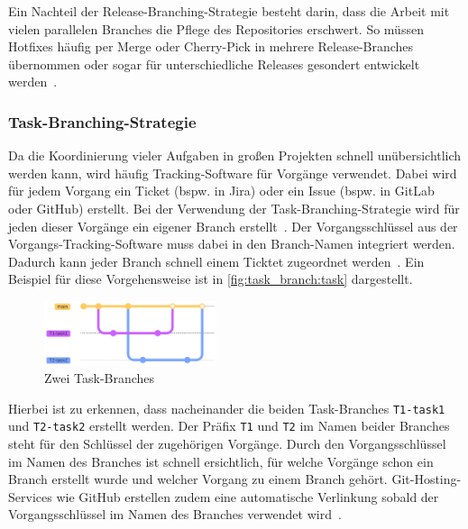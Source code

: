 Ein Nachteil der Release\hyp Branching\hyp Strategie besteht darin, dass die Arbeit mit vielen parallelen Branches die Pflege des Repositories erschwert. So müssen Hotfixes häufig per Merge oder Cherry\hyp Pick in mehrere Release\hyp Branches übernommen oder sogar für unterschiedliche Releases gesondert entwickelt werden~\cite{hart_besten_2020}.


\subsubsection{Task\hyp Branching\hyp Strategie}

Da die Koordinierung vieler Aufgaben in großen Projekten schnell unübersichtlich werden kann, wird häufig Tracking\hyp Software für Vorgänge verwendet. Dabei wird für jedem Vorgang ein Ticket (bspw. in Jira) oder ein Issue (bspw. in GitLab oder GitHub) erstellt. Bei der Verwendung der Task\hyp Branching\hyp Strategie wird für jeden dieser Vorgänge ein eigener Branch erstellt~\cite{atlassian_hintergrundwissen_2023}. Der Vorgangsschlüssel aus der Vorgangs\hyp Tracking\hyp Software muss dabei in den Branch\hyp Namen integriert werden. Dadurch kann jeder Branch schnell einem Ticktet zugeordnet werden~\cite{atlassian_hintergrundwissen_2023}. Ein Beispiel für diese Vorgehensweise ist in \autoref{fig:task_branch:task} dargestellt. 

\begin{figure}
    \includegraphics[width=0.45\textwidth]{assets/diagrams/task_branch/task-branch.pdf}
    \caption{Zwei Task\hyp Branches}
    \label{fig:task_branch:task}
\end{figure}

Hierbei ist zu erkennen, dass nacheinander die beiden Task\hyp Branches \texttt{T1-task1} und \texttt{T2-task2} erstellt werden. Der Präfix \texttt{T1} und \texttt{T2} im Namen beider Branches steht für den Schlüssel der zugehörigen Vorgänge.
Durch den Vorgangsschlüssel im Namen des Branches ist schnell ersichtlich, für welche Vorgänge schon ein Branch erstellt wurde und welcher Vorgang zu einem Branch gehört. Git\hyp Hosting\hyp Services wie GitHub erstellen zudem eine automatische Verlinkung sobald der Vorgangsschlüssel im Namen des Branches verwendet wird~\cite{github_inc_autolinked_2023}.


